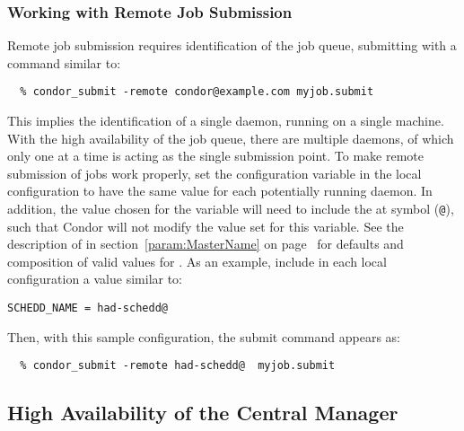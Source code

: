 \subsubsection{\label{sec:HA-remote-submit} Working with Remote Job Submission}

Remote job submission requires identification of the job queue,
submitting with a command similar to:
\footnotesize
\begin{verbatim}
  % condor_submit -remote condor@example.com myjob.submit
\end{verbatim}
\normalsize
This implies the identification of a single  daemon,
running on a single machine. 
With the high availability of the job queue, there are
multiple  daemons, of which only one at a time is acting
as the single submission point.
To make remote submission of jobs work properly,
set the configuration variable  in the local
configuration to have
the same value for each potentially running  daemon.
In addition, the value chosen for the variable 
will need to include the at symbol (\verb$@$),
such that Condor will not modify the value set for this variable.
See the description of  in
section~\ref{param:MasterName} on page~\pageref{param:MasterName}
for defaults and composition of valid values for .
As an example, include in each local configuration a value similar to:
\footnotesize
\begin{verbatim}
SCHEDD_NAME = had-schedd@
\end{verbatim}
\normalsize


Then, with this sample configuration, the 
submit command appears as:
\footnotesize
\begin{verbatim}
  % condor_submit -remote had-schedd@  myjob.submit
\end{verbatim}
\normalsize

\subsection{\label{sec:HA-negotiator} High Availability of the
Central Manager} 

